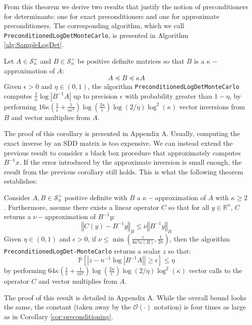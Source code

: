 From this theorem we derive two results that justify the notion of
preconditioners for determinants: one for exact preconditioners and
one for approximate preconditioners. The corresponding algorithm,
which we call \texttt{PreconditionedLogDetMonteCarlo}, is presented
in Algorithm \ref{alg:SampleLogDet}. 
\begin{corollary}
\label{cor:preconditioning}Let $A\in\mathcal{S}_{n}^{+}$ and $B\in\mathcal{S}_{n}^{+}$
be positive definite matrices so that $B$ is a $\kappa-$approximation
of $A$: 
\begin{equation}
A\preceq B\preceq\kappa A\label{eq:A-B-bounds}
\end{equation}
Given $\epsilon>0$ and $\eta\in\left(0,1\right)$, the algorithm
\texttt{PreconditionedLogDetMonteCarlo} computes $\frac{1}{n}\log\left|B^{-1}A\right|$
up to precision $\epsilon$ with probability greater than $1-\eta$,
by performing $16\kappa\left(\frac{1}{\epsilon}+\frac{1}{n\epsilon^{2}}\right)\log\left(\frac{2\kappa}{\epsilon}\right)\log\left(2/\eta\right)\log^{2}\left(\kappa\right)$
vector inversions from $B$ and vector multiplies from $A$. 
\end{corollary}
The proof of this corollary is presented in Appendix A. Usually, computing
the exact inverse by an SDD matrix is too expensive. We can instead
extend the previous result to consider a black box procedure that
approximately computes $B^{-1}x$. If the error introduced by the
approximate inversion is small enough, the result from the previous
corollary still holds. This is what the following theorem establishes: 
\begin{theorem}
\label{thm:preconditioning-approx}Consider $A,B\in\mathcal{S}_{n}^{+}$
positive definite with $B$ a $\kappa-$approximation of $A$ with
$\kappa\geq2$. Furthermore, assume there exists a linear operator
$C$ so that for all $y\in\mathbb{R}^{n}$, $C$ returns a $\nu-$approximation
of $B^{-1}y$: 
\[
\left\Vert C\left(y\right)-B^{-1}y\right\Vert _{B}\leq\nu\left\Vert B^{-1}y\right\Vert _{B}
\]
Given $\eta\in\left(0,1\right)$ and $\epsilon>0$, if $\nu\leq\min\left(\frac{\epsilon}{8\kappa^{3}\kappa\left(B\right)},\frac{1}{2\kappa}\right)$,
then the algorithm \\
 \texttt{PreconditionedLogDet-MonteCarlo} returns a scalar $z$ so
that: 
\[
\mathbb{P}\left[\left|z-n^{-1}\log\left|B^{-1}A\right|\right|\geq\epsilon\right]\leq\eta
\]
by performing $64\kappa\left(\frac{1}{\epsilon}+\frac{1}{n\epsilon^{2}}\right)\log\left(\frac{2\kappa}{\epsilon}\right)\log\left(2/\eta\right)\log^{2}\left(\kappa\right)$
vector calls to the operator $C$ and vector multiplies from $A$. 
\end{theorem}
The proof of this result is detailed in Appendix A. While the overall
bound looks the same, the constant (taken away by the $\mathcal{O}\left(\cdot\right)$
notation) is four times as large as in Corollary \ref{cor:preconditioning}.

